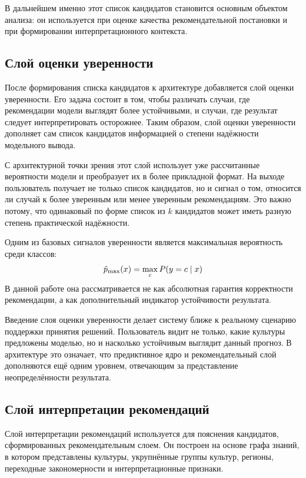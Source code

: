 В дальнейшем именно этот список кандидатов становится основным объектом анализа: он используется при оценке качества
рекомендательной постановки и при формировании интерпретационного контекста.

\subsection{Слой оценки уверенности}

После формирования списка кандидатов к архитектуре добавляется слой оценки уверенности. Его задача состоит в том, чтобы
различать случаи, где рекомендации модели выглядят более устойчивыми, и случаи, где результат следует интерпретировать
осторожнее. Таким образом, слой оценки уверенности дополняет сам список кандидатов информацией о степени надёжности
модельного вывода.

С архитектурной точки зрения этот слой использует уже рассчитанные вероятности модели и преобразует их в более
прикладной формат. На выходе пользователь получает не только список кандидатов, но и сигнал о том, относится ли случай к
более уверенным или менее уверенным рекомендациям. Это важно потому, что одинаковый по форме список из \(k\) кандидатов может иметь
разную степень практической надёжности.

Одним из базовых сигналов уверенности является максимальная вероятность среди классов:
\begin{equation}
\notag
\hat{p}_{\max}(x) = \max_c P(y=c \mid x)
\end{equation}
В данной работе она рассматривается не как абсолютная гарантия корректности рекомендации, а как дополнительный
индикатор устойчивости результата.

Введение слоя оценки уверенности делает систему ближе к реальному сценарию поддержки принятия решений. Пользователь видит не
только, какие культуры предложены моделью, но и насколько устойчивым выглядит данный прогноз. В архитектуре это
означает, что предиктивное ядро и рекомендательный слой дополняются ещё одним уровнем, отвечающим
за представление неопределённости результата.

\subsection{Слой интерпретации рекомендаций}

Слой интерпретации рекомендаций используется для пояснения кандидатов, сформированных рекомендательным слоем. Он
построен на основе графа знаний, в котором представлены культуры, укрупнённые группы культур, регионы, переходные
закономерности и интерпретационные признаки.

